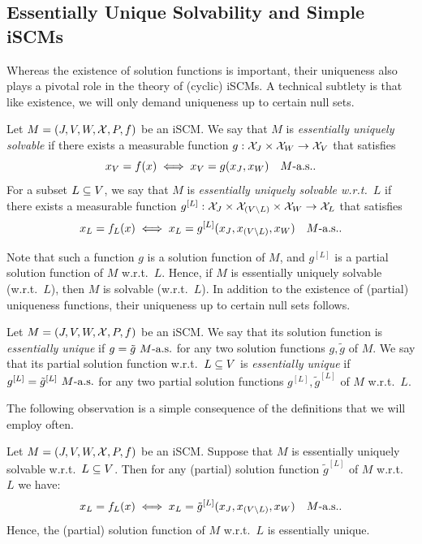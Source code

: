 \subsection{Essentially Unique Solvability and Simple iSCMs}

Whereas the existence of solution functions is important, their uniqueness also plays a pivotal role in the theory of (cyclic) iSCMs.
A technical subtlety is that like existence, we will only demand uniqueness up to certain null sets. 
\begin{Def}\label{def:scm_unique_solvability}
  Let $M = \left ( J, V, W, \mathcal{X}, P, f \right )$ be an iSCM.
  We say that $M$ is \emph{essentially uniquely solvable} if there exists a measurable function $g : \mathcal{X}_J \times \mathcal{X}_W \to \mathcal{X}_V$ that satisfies
    $$x_V = f(x) \iff x_V = g(x_J,x_W)\quad M\text{-a.s.}.$$
  For a subset $L \subseteq V$, we say that $M$ is \emph{essentially uniquely solvable w.r.t.\ $L$} if there exists a measurable function $g^{[L]} : \mathcal{X}_J \times \mathcal{X}_{(V\setminus L)} \times \mathcal{X}_W \to \mathcal{X}_L$ that satisfies
    $$x_L = f_L(x) \iff x_L = g^{[L]}(x_J,x_{(V\setminus L)},x_W)\quad M\text{-a.s.}.$$
\end{Def}
Note that such a function $g$ is a solution function of $M$, and $g^{[L]}$ is a partial solution function of $M$ w.r.t.\ $L$.
Hence, if $M$ is essentially uniquely solvable (w.r.t.\ $L$), then $M$ is solvable (w.r.t.\ $L$).
In addition to the existence of (partial) uniqueness functions, their uniqueness up to certain null sets follows.
\begin{Def}\label{def:scm_essentially_unique_solution_function}
  Let $M = \left ( J, V, W, \mathcal{X}, P, f \right )$ be an iSCM.
  We say that its solution function is \emph{essentially unique} if $g = \tilde{g}\ M\text{-a.s.}$ for any two solution functions $g,\tilde{g}$ of $M$.
  We say that its partial solution function w.r.t.\ $L \subseteq V$ is \emph{essentially unique} if $g^{[L]} = \tilde{g}^{[L]}\ M\text{-a.s.}$ for any two partial solution functions $g^{[L]}, \tilde{g}^{[L]}$ of $M$ w.r.t.\ $L$.
\end{Def}
The following observation is a simple consequence of the definitions that we will employ often.
\begin{Prp}\label{prp:scm_essentially_unique_solution_functions}
  Let $M = \left ( J, V, W, \mathcal{X}, P, f \right )$ be an iSCM.
  Suppose that $M$ is essentially uniquely solvable w.r.t.\ $L \subseteq V$.
  Then for any (partial) solution function $\tilde{g}^{[L]}$ of $M$ w.r.t.\ $L$ we have:
    $$x_L = f_L(x) \iff x_L = \tilde{g}^{[L]}(x_J,x_{(V\setminus L)},x_W)\quad M\text{-a.s.}.$$
  Hence, the (partial) solution function of $M$ w.r.t.\ $L$ is essentially unique.
\end{Prp}
